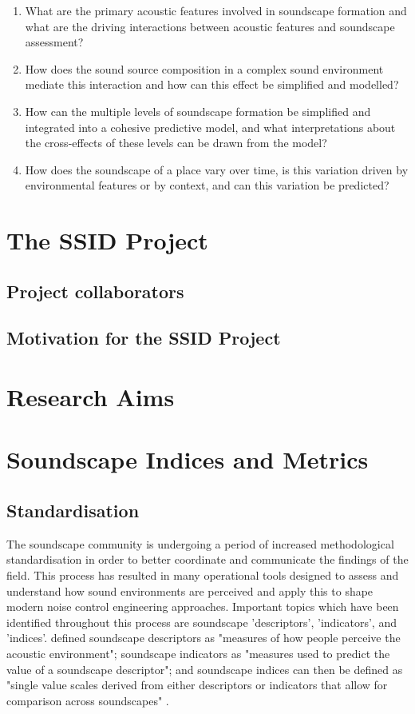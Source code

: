  \begin{enumerate}
    \item What are the primary acoustic features involved in soundscape formation and what are the driving interactions between acoustic features and soundscape assessment?
    \item How does the sound source composition in a complex sound environment mediate this interaction and how can this effect be simplified and modelled?
    \item How can the multiple levels of soundscape formation be simplified and integrated into a cohesive predictive model, and what interpretations about the cross-effects of these levels can be drawn from the model?
    \item How does the soundscape of a place vary over time, is this variation driven by environmental features or by context, and can this variation be predicted?
  \end{enumerate}

\section{The SSID Project}

  \subsection{Project collaborators}

  \subsection{Motivation for the SSID Project}

\section{Research Aims}

\section{Soundscape Indices and Metrics}

  \subsection{Standardisation}
    The soundscape community is undergoing a period of increased methodological standardisation in order to better coordinate and communicate the findings of the field. This process has resulted in many operational tools designed to assess and understand how sound environments are perceived and apply this to shape modern noise control engineering approaches. Important topics which have been identified throughout this process are soundscape 'descriptors', 'indicators', and 'indices'. \cite{Aletta2016} defined soundscape descriptors as "measures of how people perceive the acoustic environment"; soundscape indicators as "measures used to predict the value of a soundscape descriptor"; and soundscape indices can then be defined as "single value scales derived from either descriptors or indicators that allow for comparison across soundscapes" \cite{Kang2019}.

